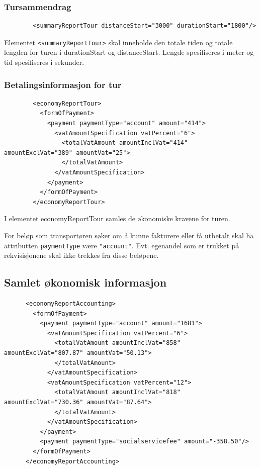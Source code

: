 \documentclass[a4paper,titlepage,norsk,11pt]{article}
\begin{document}
\subsubsection{Tursammendrag}

\begin{lstlisting}
        <summaryReportTour distanceStart="3000" durationStart="1800"/>
\end{lstlisting}

Elementet \lstinline{<summaryReportTour>} skal inneholde den totale tiden og totale lengden for turen i durationStart og distanceStart. Lengde spesifiseres i meter og tid spesifiseres i sekunder.

\subsubsection{Betalingsinformasjon for tur}

\begin{lstlisting}
        <economyReportTour>
          <formOfPayment>
            <payment paymentType="account" amount="414">
              <vatAmountSpecification vatPercent="6">
                <totalVatAmount amountInclVat="414" amountExclVat="389" amountVat="25">
                </totalVatAmount>
              </vatAmountSpecification>
            </payment>
          </formOfPayment>
        </economyReportTour>
\end{lstlisting}

I elementet economyReportTour samles de økonomiske kravene for turen.

For beløp som transportøren søker om å kunne fakturere eller få utbetalt skal ha attributten \lstinline{paymentType} være \lstinline{"account"}. Evt. egenandel som er trukket på rekvisisjonene skal ikke trekkes fra disse beløpene.

\subsection{Samlet økonomisk informasjon}

\begin{lstlisting}
      <economyReportAccounting>
        <formOfPayment>
          <payment paymentType="account" amount="1681">
            <vatAmountSpecification vatPercent="6">
              <totalVatAmount amountInclVat="858" amountExclVat="807.87" amountVat="50.13">
              </totalVatAmount>
            </vatAmountSpecification>
            <vatAmountSpecification vatPercent="12">
              <totalVatAmount amountInclVat="818" amountExclVat="730.36" amountVat="87.64">
              </totalVatAmount>
            </vatAmountSpecification>
          </payment>
          <payment paymentType="socialservicefee" amount="-358.50"/>
        </formOfPayment>
      </economyReportAccounting>
\end{lstlisting}
\end{document}
